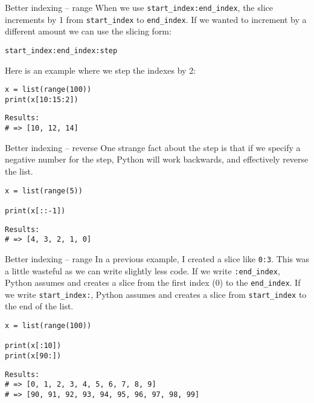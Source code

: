 \documentclass[10pt]{beamer}
\begin{document}
\begin{frame}[label={sec:orge06b828},fragile]{Better indexing -- range}
 When we use \texttt{start\_index:end\_index}, the slice increments by 1 from \texttt{start\_index} to
\texttt{end\_index}. If we wanted to increment by a different amount we can use the slicing
form:

\begin{verbatim}
start_index:end_index:step
\end{verbatim}

Here is an example where we step the indexes by 2:

\begin{verbatim}
x = list(range(100))
print(x[10:15:2])
\end{verbatim}

\begin{verbatim}
Results: 
# => [10, 12, 14]
\end{verbatim}
\end{frame}

\begin{frame}[label={sec:org7a61cc0},fragile]{Better indexing -- reverse}
 One strange fact about the step is that if we specify a negative number for the step,
Python will work backwards, and effectively reverse the list.

\begin{verbatim}
x = list(range(5))

print(x[::-1])
\end{verbatim}

\begin{verbatim}
Results: 
# => [4, 3, 2, 1, 0]
\end{verbatim}
\end{frame}

\begin{frame}[label={sec:org50df1bd},fragile]{Better indexing -- range}
 In a previous example, I created a slice like \texttt{0:3}. This was a little wasteful as we
can write slightly less code. If we write \texttt{:end\_index}, Python assumes and creates a
slice from the first index (0) to the \texttt{end\_index}. If we write \texttt{start\_index:}, Python
assumes and creates a slice from \texttt{start\_index} to the end of the list.

\begin{verbatim}
x = list(range(100))

print(x[:10])
print(x[90:])
\end{verbatim}

\begin{verbatim}
Results: 
# => [0, 1, 2, 3, 4, 5, 6, 7, 8, 9]
# => [90, 91, 92, 93, 94, 95, 96, 97, 98, 99]
\end{verbatim}
\end{frame}
\end{document}
